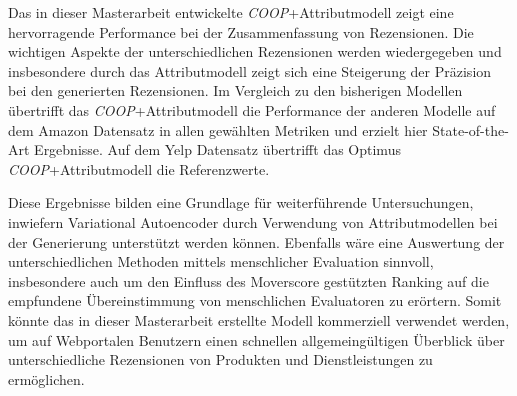 Das in dieser Masterarbeit entwickelte \textit{COOP}+Attributmodell zeigt eine hervorragende Performance bei der Zusammenfassung von Rezensionen. 
Die wichtigen Aspekte der unterschiedlichen Rezensionen werden wiedergegeben und insbesondere durch das Attribut\-modell zeigt sich eine Steigerung der Präzision bei den generierten Rezensionen. 
Im Vergleich zu den bisherigen Modellen übertrifft das \textit{COOP}+Attributmodell die Performance der anderen Modelle auf dem Amazon Datensatz in allen gewählten Metriken und erzielt hier State-of-the-Art Ergebnisse.
Auf dem Yelp Datensatz übertrifft das Optimus \textit{COOP}+Attributmodell die Referenzwerte.

Diese Ergebnisse bilden eine Grundlage für weiterführende Untersuchungen, inwiefern Variational Autoencoder durch Verwendung von Attributmodellen bei der Generierung unterstützt werden können.
Ebenfalls wäre eine Auswertung der unterschiedlichen Methoden mittels menschlicher Evaluation sinnvoll, insbesondere auch um den Einfluss des Moverscore gestützten Ranking auf die empfundene Übereinstimmung von menschlichen Evaluatoren zu erörtern.
Somit könnte das in dieser Masterarbeit erstellte Modell kommerziell verwendet werden, um auf Webportalen Benutzern einen schnellen allgemeingültigen Überblick über unterschiedliche Rezensionen von Produkten und Dienstleistungen zu ermöglichen.



\pagebreak
